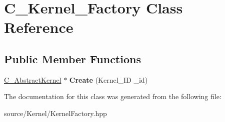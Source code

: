 \hypertarget{class_c___kernel___factory}{\section{C\-\_\-\-Kernel\-\_\-\-Factory Class Reference}
\label{class_c___kernel___factory}
}
\subsection*{Public Member Functions}
\begin{DoxyCompactItemize}
\item 
\hypertarget{class_c___kernel___factory_a4e0263fb3805d2abf65c45d12ac2365e}{\hyperlink{class_c___abstract_kernel}{C\-\_\-\-Abstract\-Kernel} $\ast$ {\bfseries Create} (Kernel\-\_\-\-I\-D \-\_\-id)}\label{class_c___kernel___factory_a4e0263fb3805d2abf65c45d12ac2365e}

\end{DoxyCompactItemize}


The documentation for this class was generated from the following file\-:\begin{DoxyCompactItemize}
\item 
source/\-Kernel/Kernel\-Factory.\-hpp\end{DoxyCompactItemize}
